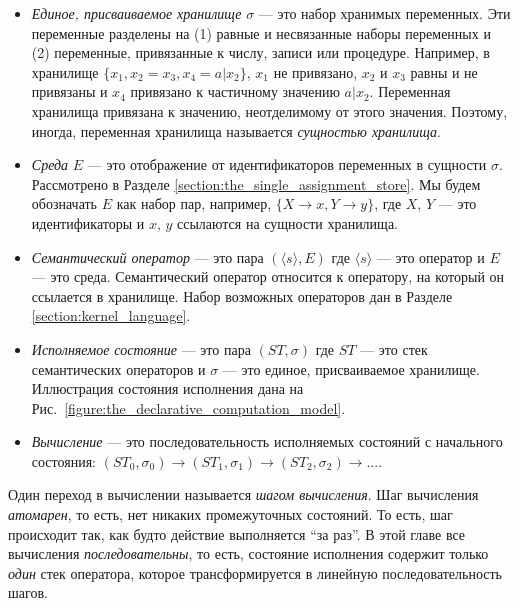\begin{itemize}
\item{\emph{Единое, присваиваемое хранилище} $\sigma$  --- это набор хранимых переменных. Эти переменные разделены на (1) равные и несвязанные наборы переменных и (2) переменные, привязанные к числу, записи или процедуре. Например, в хранилище $ \{ {x}_{1}, {x}_{2} = {x}_{3}, {x}_{4} = a | {x}_{2} \} $, ${x}_{1}$ не привязано, ${x}_{2}$ и ${x}_{3}$ равны и не привязаны и ${x}_{4}$ привязано к частичному значению $a | {x}_{2}$. Переменная хранилища привязана к значению, неотделимому от этого значения. Поэтому, иногда, переменная хранилища называется \emph{сущностью хранилища}.}

\item{\emph{Среда} $E$ --- это отображение от идентификаторов переменных в сущности $\sigma$. Рассмотрено в Разделе \ref{section:the_single_assignment_store}. Мы будем обозначать $E$ как набор пар, например, $\{ X \to x, Y \to y \} $, где $X$, $Y$ --- это идентификаторы и $x$, $y$ ссылаются на сущности хранилища.}

\item{\emph{Семантический оператор} --- это пара $ ( \langle s \rangle, E) $ где $ \langle s \rangle$ --- это оператор и $E$ --- это среда. Семантический оператор относится к оператору, на который он ссылается в хранилище. Набор возможных операторов дан в Разделе \ref{section:kernel_language}.}

\item{\emph{Исполняемое состояние} --- это пара $ ( ST, \sigma ) $ где $ST$ --- это стек семантических операторов и $\sigma$ --- это единое, присваиваемое хранилище. Иллюстрация состояния исполнения дана на Рис.~\ref{figure:the_declarative_computation_model}.}

\item{\emph{Вычисление} --- это последовательность исполняемых состояний с начального состояния: $ ( {ST}_{0}, {\sigma}_{0} ) \to ({ST}_{1}, {\sigma}_{1} ) \to ({ST}_{2} , {\sigma}_{2} ) \to ...$.}
\end{itemize}

Один переход в вычислении называется \emph{шагом вычисления}. Шаг вычисления \emph{атомарен}, то есть, нет никаких промежуточных состояний. То есть, шаг происходит так, как будто действие выполняется ``за раз''. В этой главе все вычисления \emph{последовательны}, то есть, состояние исполнения содержит только \emph{один} стек оператора, которое трансформируется в линейную последовательность шагов.


